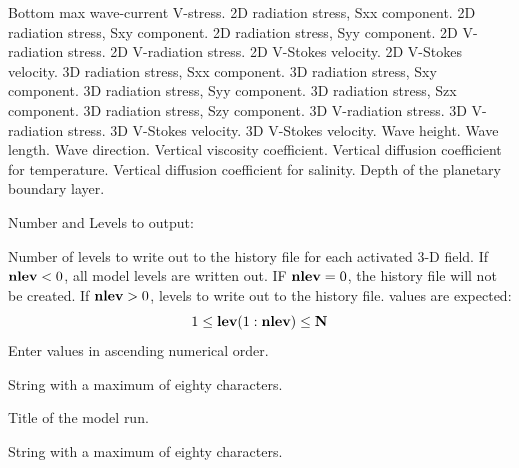 \begin{klist}
\begin{klist}
          Bottom max wave-current V-stress.
\vspace{2 mm}
         2D radiation stress, Sxx component.
         2D radiation stress, Sxy component.
         2D radiation stress, Syy component.
         2D V-radiation stress.
         2D V-radiation stress.
         2D V-Stokes velocity.
         2D V-Stokes velocity.
\vspace{2 mm}
         3D radiation stress, Sxx component.
         3D radiation stress, Sxy component.
         3D radiation stress, Syy component.
         3D radiation stress, Szx component.
         3D radiation stress, Szy component.
         3D V-radiation stress.
         3D V-radiation stress.
         3D V-Stokes velocity.
         3D V-Stokes velocity.
\vspace{2 mm}
         Wave height.
         Wave length.
         Wave direction.
\vspace{2 mm}
\vspace{2 mm}
          Vertical viscosity coefficient.
          Vertical diffusion coefficient for
     temperature.
          Vertical diffusion coefficient for
     salinity.
          Depth of the planetary boundary layer.
     \end{klist}
     Number and Levels to output:
     \begin{klist}
         Number of levels to write out to the history
    file for each activated 3-D field. If $\mbox{\bf nlev}<0$, all
    model levels are written out. IF $\mbox{\bf nlev}=0$, the history
    file will not be created.
         If $\mbox{\bf nlev}>0$, levels to write out to the
    history file.   values are expected:
\[
                       1 \leq \mbox{\bf lev}(1:\mbox{\bf nlev}) \leq \mbox{\bf N}
\]
            Enter values in ascending numerical order.
     \end{klist}
     String with a maximum of eighty characters.
     \begin{klist}
           Title of the model run.
     \end{klist}
     String with a maximum of eighty characters.

\end{klist}
